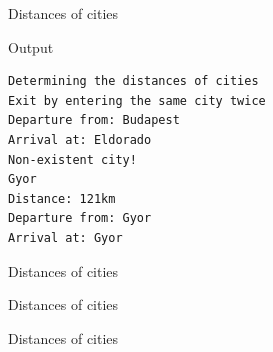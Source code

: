 \documentclass[usenames,dvipsnames,aspectratio=169]{beamer}
\begin{document}
\begin{frame}[fragile]{Distances of cities}
  \begin{block}{Output}
    \begin{verbatim}
Determining the distances of cities
Exit by entering the same city twice
Departure from: Budapest
Arrival at: Eldorado
Non-existent city!
Gyor
Distance: 121km
Departure from: Gyor
Arrival at: Gyor
\end{verbatim}
  \end{block}
\end{frame}

\begin{frame}{Distances of cities}
  \begin{exampleblock}{}
    \footnotesize
    
  \end{exampleblock}
\end{frame}

\begin{frame}{Distances of cities}
  \begin{exampleblock}{}
    \scriptsize
    \vspace{-.3cm}
    
    \vspace{-.3cm}
  \end{exampleblock}
\end{frame}

\begin{frame}{Distances of cities}
  \begin{exampleblock}{}
    \vspace{-.3cm}
    
    \vspace{-.3cm}
  \end{exampleblock}
\end{frame}
\end{document}
